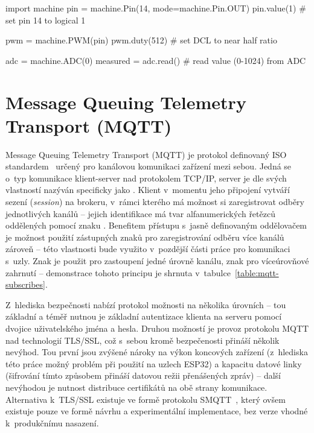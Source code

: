 \begin{code}[language=Python,caption={Ukázka práce s~periferiemi čipu pomocí vestavěných knihoven jazyka MicroPython
-- v~první části se jedná o~nastavení pinu na logickou hodnotu 1, prostřední část patří nastavení pulzně šířkové
modulace (PWM) na pinu čipu a konec je ve znamení čtení z~prvního kanálu analogově-digitálního převodníku (ADC).}]
import machine
pin = machine.Pin(14, mode=machine.Pin.OUT)
pin.value(1) # set pin 14 to logical 1

pwm = machine.PWM(pin)
pwm.duty(512) # set DCL to near half ratio

adc = machine.ADC(0)
measured = adc.read() # read value (0-1024) from ADC
\end{code}

\section{Message Queuing Telemetry Transport (MQTT)}\label{sec:mqtt}
Message Queuing Telemetry Transport (MQTT) je protokol definovaný ISO standardem~\cite{ISOMQTT} určený pro
kanálovou komunikaci zařízení mezi sebou.
Jedná se o~typ komunikace klient-server nad protokolem TCP/IP, server je dle svých vlastností nazýván
specificky jako .
Klient v~momentu jeho připojení vytváří sezení (\textit{session}) na brokeru, v~rámci kterého má možnost si zaregistrovat
odběry jednotlivých kanálů -- jejich identifikace má tvar alfanumerických řetězců oddělených pomocí znaku \ic{/}.
Benefitem přístupu s~jasně definovaným oddělovačem je možnost použití zástupných znaků pro
zaregistrování odběru více kanálů zároveň -- této vlastnosti bude využito v~pozdější části práce pro komunikaci s~uzly.
Znak \ic{+} je použit pro zastoupení jedné úrovně kanálu, znak \ic{#} pro víceúrovňové zahrnutí -- demonstrace tohoto
principu je shrnuta v~tabulce~\ref{table:mqtt-subscribes}.

Z~hlediska bezpečnosti nabízí protokol možnosti na několika úrovních -- tou základní a téměř nutnou je základní
autentizace klienta na serveru pomocí dvojice uživatelského jména a hesla.
Druhou možností je provoz protokolu MQTT nad technologií TLS/SSL, což s~sebou kromě bezpečenosti přináší několik nevýhod.
Tou první jsou zvýšené nároky na výkon koncových zařízení (z~hlediska této práce možný problém při použití na
uzlech ESP32) a kapacitu datové linky (šifrování tímto způsobem přináší datovou režii přenášených zpráv) -- další
nevýhodou je nutnost distribuce certifikátů na obě strany komunikace.
Alternativa k~TLS/SSL existuje ve formě protokolu SMQTT~\cite{SMQTT}, který
ovšem existuje pouze ve formě návrhu a experimentální implementace, bez verze vhodné k~produkčnímu nasazení.

